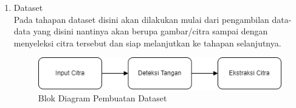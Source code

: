 \begin{enumerate}
  \item Dataset \\
  Pada tahapan dataset disini akan dilakukan mulai dari pengambilan data-data yang disini nantinya akan berupa gambar/citra sampai dengan menyeleksi citra tersebut dan siap melanjutkan ke tahapan selanjutnya.

\begin{figure}[!htbp]
	\centering
	\includegraphics[width=0.7\linewidth]{gambar/Dataset.png}
	\caption{Blok Diagram Pembuatan Dataset}
	\label{fig:gambar32}
\end{figure}


\end{enumerate}

